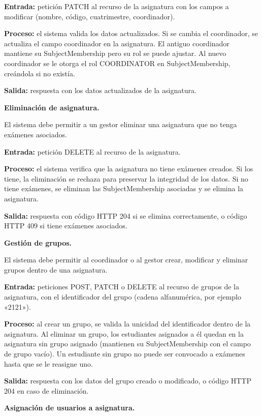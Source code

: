 \begin{functional}
\begin{functional}
    \textbf{Entrada:} petición PATCH al recurso de la asignatura con los campos a modificar (nombre, código, cuatrimestre, coordinador).

    \textbf{Proceso:} el sistema valida los datos actualizados. Si se cambia el coordinador, se actualiza el campo coordinador en la asignatura. El antiguo coordinador mantiene su SubjectMembership pero su rol se puede ajustar. Al nuevo coordinador se le otorga el rol COORDINATOR en SubjectMembership, creándola si no existía.

    \textbf{Salida:} respuesta con los datos actualizados de la asignatura.

    \item \textbf{Eliminación de asignatura.}

    El sistema debe permitir a un gestor eliminar una asignatura que no tenga exámenes asociados.

    \textbf{Entrada:} petición DELETE al recurso de la asignatura.

    \textbf{Proceso:} el sistema verifica que la asignatura no tiene exámenes creados. Si los tiene, la eliminación se rechaza para preservar la integridad de los datos. Si no tiene exámenes, se eliminan las SubjectMembership asociadas y se elimina la asignatura.

    \textbf{Salida:} respuesta con código HTTP 204 si se elimina correctamente, o código HTTP 409 si tiene exámenes asociados.

    \item \textbf{Gestión de grupos.}

    El sistema debe permitir al coordinador o al gestor crear, modificar y eliminar grupos dentro de una asignatura.

    \textbf{Entrada:} peticiones POST, PATCH o DELETE al recurso de grupos de la asignatura, con el identificador del grupo (cadena alfanumérica, por ejemplo «2121»).

    \textbf{Proceso:} al crear un grupo, se valida la unicidad del identificador dentro de la asignatura. Al eliminar un grupo, los estudiantes asignados a él quedan en la asignatura sin grupo asignado (mantienen su SubjectMembership con el campo de grupo vacío). Un estudiante sin grupo no puede ser convocado a exámenes hasta que se le reasigne uno.

    \textbf{Salida:} respuesta con los datos del grupo creado o modificado, o código HTTP 204 en caso de eliminación.

    \item \textbf{Asignación de usuarios a asignatura.}


\end{functional}
\end{functional}
